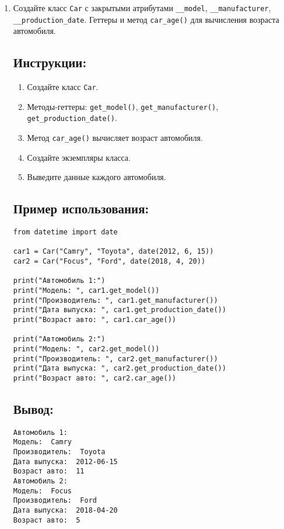 \begin{enumerate}
\item
Создайте класс \texttt{Car} с закрытыми атрибутами \texttt{\_\_model}, \texttt{\_\_manufacturer}, \texttt{\_\_production\_date}. Геттеры и метод \texttt{car\_age()} для вычисления возраста автомобиля.

\subsection*{Инструкции:}
\begin{enumerate}
    \item Создайте класс \texttt{Car}.
    \item Методы-геттеры: \texttt{get\_model()}, \texttt{get\_manufacturer()}, \texttt{get\_production\_date()}.
    \item Метод \texttt{car\_age()} вычисляет возраст автомобиля.
    \item Создайте экземпляры класса.
    \item Выведите данные каждого автомобиля.
\end{enumerate}

\subsection*{Пример использования:}
\begin{lstlisting}[caption=Пример кода]
from datetime import date

car1 = Car("Camry", "Toyota", date(2012, 6, 15))
car2 = Car("Focus", "Ford", date(2018, 4, 20))

print("Автомобиль 1:")
print("Модель: ", car1.get_model())
print("Производитель: ", car1.get_manufacturer())
print("Дата выпуска: ", car1.get_production_date())
print("Возраст авто: ", car1.car_age())

print("Автомобиль 2:")
print("Модель: ", car2.get_model())
print("Производитель: ", car2.get_manufacturer())
print("Дата выпуска: ", car2.get_production_date())
print("Возраст авто: ", car2.car_age())
\end{lstlisting}

\subsection*{Вывод:}
\begin{lstlisting}[caption=Ожидаемый вывод]
Автомобиль 1:
Модель:  Camry
Производитель:  Toyota
Дата выпуска:  2012-06-15
Возраст авто:  11
Автомобиль 2:
Модель:  Focus
Производитель:  Ford
Дата выпуска:  2018-04-20
Возраст авто:  5
\end{lstlisting}


\end{enumerate}

